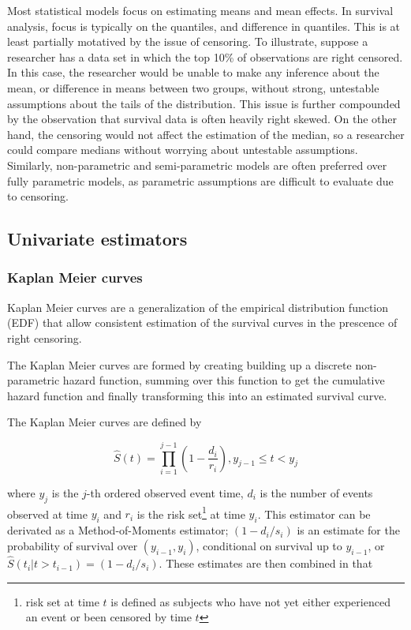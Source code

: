 \documentclass[a4paper]{article}
\begin{document}
  Most statistical models focus on estimating means and mean effects. In survival analysis, focus is typically on the quantiles, and difference in quantiles. This is at least partially motatived by the issue of censoring. To illustrate, suppose a researcher has a data set in which the top 10\% of observations are right censored. In this case, the researcher would be unable to make any inference about the mean, or difference in means between two groups, without strong, untestable assumptions about the tails of the distribution. This issue is further compounded by the observation that survival data is often heavily right skewed. On the other hand, the censoring would not affect the estimation of the median, so a researcher could compare medians without worrying about untestable assumptions. Similarly, non-parametric and semi-parametric models are often preferred over fully parametric models, as parametric assumptions are difficult to evaluate due to censoring. 
  
  
  \subsection{Univariate estimators}
    
    \subsubsection{Kaplan Meier curves}
    
    Kaplan Meier curves are a generalization of the empirical distribution function (EDF) that allow consistent estimation of the survival curves in the prescence of right censoring. 
    
    The Kaplan Meier curves are formed by creating building up a discrete non-parametric hazard function, summing over this function to get the cumulative hazard function and finally transforming this into an estimated survival curve. 
    
  The Kaplan Meier curves are defined by 
    
    \[
    \hat S(t) = 
    \displaystyle
    \prod_{i = 1}^{j-1}\left(1 - \frac{d_i}{r_i} \right), 
    y_{j-1} \leq t < y_j
    \]
    
    where $y_j$ is the $j$-th ordered observed event time, $d_i$ is the number of events observed at time $y_i$ and $r_i$ is the risk set\footnote{risk set at time $t$ is defined as subjects who have not yet either experienced an event or been censored by time $t$} at time $y_i$. This estimator can be derivated as a Method-of-Moments estimator; $(1 - d_i/s_i)$ is an estimate for the probability of survival over $(y_{i-1}, y_i)$, conditional on survival up to $y_{i-1}$, or $\hat S(t_i|t > t_{i-1}) = (1 - d_i/s_i)$. These estimates are then combined in that 
    
\end{document}
